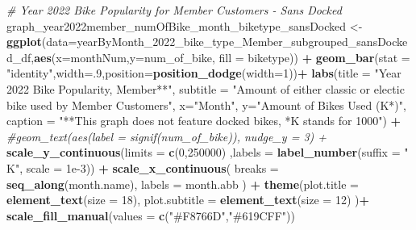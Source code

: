 \documentclass[
]{article}
\newenvironment{Shaded}{\begin{snugshade}}{\end{snugshade}}
\newcommand{\AttributeTok}[1]{\textcolor[rgb]{0.13,0.29,0.53}{#1}}
\newcommand{\CommentTok}[1]{\textcolor[rgb]{0.56,0.35,0.01}{\textit{#1}}}
\newcommand{\DecValTok}[1]{\textcolor[rgb]{0.00,0.00,0.81}{#1}}
\newcommand{\FloatTok}[1]{\textcolor[rgb]{0.00,0.00,0.81}{#1}}
\newcommand{\FunctionTok}[1]{\textcolor[rgb]{0.13,0.29,0.53}{\textbf{#1}}}
\newcommand{\NormalTok}[1]{#1}
\newcommand{\OtherTok}[1]{\textcolor[rgb]{0.56,0.35,0.01}{#1}}
\newcommand{\SpecialCharTok}[1]{\textcolor[rgb]{0.81,0.36,0.00}{\textbf{#1}}}
\newcommand{\StringTok}[1]{\textcolor[rgb]{0.31,0.60,0.02}{#1}}
\begin{document}
\begin{Shaded}
\begin{Highlighting}[]
\CommentTok{\# Year 2022 Bike Popularity for Member Customers {-} Sans Docked}
\NormalTok{graph\_year2022member\_numOfBike\_month\_biketype\_sansDocked }\OtherTok{\textless{}{-}} \FunctionTok{ggplot}\NormalTok{(}\AttributeTok{data=}\NormalTok{yearByMonth\_2022\_bike\_type\_Member\_subgrouped\_sansDocked\_df,}\FunctionTok{aes}\NormalTok{(}\AttributeTok{x=}\NormalTok{monthNum,}\AttributeTok{y=}\NormalTok{num\_of\_bike, }\AttributeTok{fill =}\NormalTok{ biketype)) }\SpecialCharTok{+}
  \FunctionTok{geom\_bar}\NormalTok{(}\AttributeTok{stat =} \StringTok{"identity"}\NormalTok{,}\AttributeTok{width=}\NormalTok{.}\DecValTok{9}\NormalTok{,}\AttributeTok{position=}\FunctionTok{position\_dodge}\NormalTok{(}\AttributeTok{width=}\DecValTok{1}\NormalTok{))}\SpecialCharTok{+}
  \FunctionTok{labs}\NormalTok{(}\AttributeTok{title =} \StringTok{"Year 2022 Bike Popularity, Member**"}\NormalTok{,}
       \AttributeTok{subtitle =} \StringTok{"Amount of either classic or electic bike used by Member Customers"}\NormalTok{,}
       \AttributeTok{x=}\StringTok{"Month"}\NormalTok{,}
       \AttributeTok{y=}\StringTok{"Amount of Bikes Used (K*)"}\NormalTok{,}
       \AttributeTok{caption =} \StringTok{"**This graph does not feature docked bikes, *K stands for 1000"}\NormalTok{) }\SpecialCharTok{+}
  \CommentTok{\#geom\_text(aes(label = signif(num\_of\_bike)), nudge\_y = 3) +}
  \FunctionTok{scale\_y\_continuous}\NormalTok{(}\AttributeTok{limits =} \FunctionTok{c}\NormalTok{(}\DecValTok{0}\NormalTok{,}\DecValTok{250000}\NormalTok{) ,}\AttributeTok{labels =} \FunctionTok{label\_number}\NormalTok{(}\AttributeTok{suffix =} \StringTok{" K"}\NormalTok{, }\AttributeTok{scale =} \FloatTok{1e{-}3}\NormalTok{)) }\SpecialCharTok{+}
  \FunctionTok{scale\_x\_continuous}\NormalTok{(}
    \AttributeTok{breaks =} \FunctionTok{seq\_along}\NormalTok{(month.name), }
    \AttributeTok{labels =}\NormalTok{ month.abb}
\NormalTok{  )  }\SpecialCharTok{+}
  \FunctionTok{theme}\NormalTok{(}\AttributeTok{plot.title =} \FunctionTok{element\_text}\NormalTok{(}\AttributeTok{size =} \DecValTok{18}\NormalTok{),}
        \AttributeTok{plot.subtitle =} \FunctionTok{element\_text}\NormalTok{(}\AttributeTok{size =} \DecValTok{12}\NormalTok{)}
\NormalTok{  )}\SpecialCharTok{+}
  \FunctionTok{scale\_fill\_manual}\NormalTok{(}\AttributeTok{values =} \FunctionTok{c}\NormalTok{(}\StringTok{"\#F8766D"}\NormalTok{,}\StringTok{"\#619CFF"}\NormalTok{))}


\end{Highlighting}
\end{Shaded}
\end{document}
